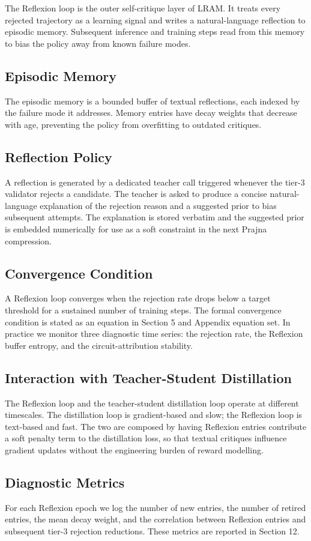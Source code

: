 The Reflexion loop is the outer self-critique layer of LRAM. It treats every rejected trajectory as a learning signal and writes a natural-language reflection to episodic memory. Subsequent inference and training steps read from this memory to bias the policy away from known failure modes.

\subsection{Episodic Memory}
The episodic memory is a bounded buffer of textual reflections, each indexed by the failure mode it addresses. Memory entries have decay weights that decrease with age, preventing the policy from overfitting to outdated critiques.

\subsection{Reflection Policy}
A reflection is generated by a dedicated teacher call triggered whenever the tier-3 validator rejects a candidate. The teacher is asked to produce a concise natural-language explanation of the rejection reason and a suggested prior to bias subsequent attempts. The explanation is stored verbatim and the suggested prior is embedded numerically for use as a soft constraint in the next Prajna compression.

\subsection{Convergence Condition}
A Reflexion loop converges when the rejection rate drops below a target threshold for a sustained number of training steps. The formal convergence condition is stated as an equation in Section 5 and Appendix equation set. In practice we monitor three diagnostic time series: the rejection rate, the Reflexion buffer entropy, and the circuit-attribution stability.

\subsection{Interaction with Teacher-Student Distillation}
The Reflexion loop and the teacher-student distillation loop operate at different timescales. The distillation loop is gradient-based and slow; the Reflexion loop is text-based and fast. The two are composed by having Reflexion entries contribute a soft penalty term to the distillation loss, so that textual critiques influence gradient updates without the engineering burden of reward modelling.

\subsection{Diagnostic Metrics}
For each Reflexion epoch we log the number of new entries, the number of retired entries, the mean decay weight, and the correlation between Reflexion entries and subsequent tier-3 rejection reductions. These metrics are reported in Section 12.
